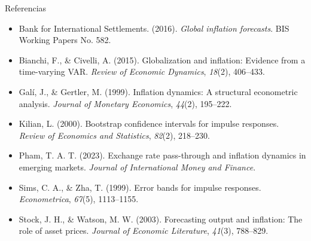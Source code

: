 \documentclass[aspectratio=169, 11pt]{beamer}
\begin{document}
\begin{frame}[allowframebreaks]{Referencias}
\small
\begin{itemize}
  \item Bank for International Settlements. (2016). \textit{Global inflation forecasts}. BIS Working Papers No. 582.
  
  \item Bianchi, F., \& Civelli, A. (2015). Globalization and inflation: Evidence from a time-varying VAR. \textit{Review of Economic Dynamics}, \textit{18}(2), 406–433.
  
  \item Galí, J., \& Gertler, M. (1999). Inflation dynamics: A structural econometric analysis. \textit{Journal of Monetary Economics}, \textit{44}(2), 195–222.
  
  \item Kilian, L. (2000). Bootstrap confidence intervals for impulse responses. \textit{Review of Economics and Statistics}, \textit{82}(2), 218–230.
  
  \item Pham, T. A. T. (2023). Exchange rate pass-through and inflation dynamics in emerging markets. \textit{Journal of International Money and Finance}.
  
  \item Sims, C. A., \& Zha, T. (1999). Error bands for impulse responses. \textit{Econometrica}, \textit{67}(5), 1113–1155.
  
  \item Stock, J. H., \& Watson, M. W. (2003). Forecasting output and inflation: The role of asset prices. \textit{Journal of Economic Literature}, \textit{41}(3), 788–829.
\end{itemize}
\end{frame}
\end{document}

